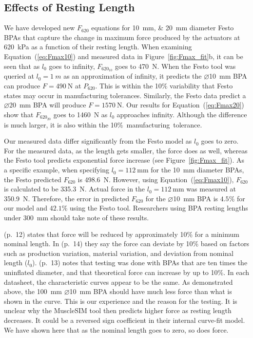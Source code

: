 \subsection{Effects of Resting Length}\label{sec:disc_effects}
We have developed new $F_{620}$ equations for \qtylist{10;20}{\mm} diameter Festo BPAs that capture the change in maximum force produced by the actuators at  \qty{620}{\kPa} as a function of their resting length. When examining Equation~(\ref{eq:Fmax10}) and measured data in Figure~\ref{fig:Fmax_fit}b, it can be seen that as $l_0$ goes to infinity, $F_{620_{10}}$ goes to \qty{470}{\N}. When the Festo tool \citep{lang_robert_musclesim_2005} was queried at $l_0=\qty{1}{m}$ as an approximation of infinity, it predicts the $\diameter$\qty{10}{\mm} BPA can produce $F=\qty{490}{\N}$ at $P_{620}$. This is within the 10\% variability that Festo states may occur in manufacturing tolerances. Similarly, the Festo data predict a $\diameter$\qty{20}{\mm} BPA will produce $F=\qty{1570}{\N}$. Our results for Equation~(\ref{eq:Fmax20}) show that  $F_{620_{20}}$ goes to \qty{1460}{\N} as $l_0$ approaches infinity. Although the difference is much larger, it is also within the \mbox{10\% manufacturing tolerance. }

Our measured data differ significantly from the Festo model as $l_0$ goes to zero. For the measured data, as the length gets smaller, the force does as well, whereas the Festo tool predicts exponential force increase (see Figure~\ref{fig:Fmax_fit}). As a specific example, when specifying $l_0=\qty{112}{\mm}$ for the \qty{10}{\mm} diameter BPAs, the Festo predicted $F_{620}$ is \qty{498.6}{\N}. However, using Equation~(\ref{eq:Fmax10}), $F_{620}$ is calculated to be \qty{335.3}{\N}. Actual force in the $l_0=\qty{112}{\mm}$ was measured at \qty{350.9}{\N}. Therefore, the error in predicted $F_{620}$ for the $\diameter$\qty{10}{\mm} BPA is $4.5\%$ for our model and $42.1\%$ using the Festo tool. Researchers using BPA resting lengths under \qty{300}{\mm} should take note of these results.

\citet{festo_2026} (p.~12) states that force will be reduced by approximately 10\% for a minimum nominal length. In \citet{festo_2018} (p.~14) they say the force can deviate by 10\% based on factors such as production variation, material variation, and deviation from nominal length ($l_0$). \citet{festo_2013} (p.~13) notes that testing was done with BPAs that are ten times the uninflated diameter, and that theoretical force can increase by up to 10\%. In each datasheet, the characteristic curves appear to be the same. As demonstrated above, the \qty{100}{\mm} $\diameter$\qty{10}{\mm} BPA should have much less force than what is shown in the curve. This is our experience and the reason for the testing. It is unclear why the MuscleSIM tool \citep{lang_robert_musclesim_2005} then predicts higher force as resting length decreases. It could be a reversed sign coefficient in their internal curve-fit model. We have shown here that as the nominal length goes to zero, so does force. 

